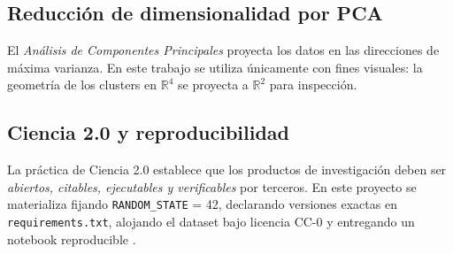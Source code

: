 \subsection{Reducción de dimensionalidad por PCA}

El \emph{Análisis de Componentes Principales} \citep{pearson1901pca,jolliffe2002principal} proyecta los datos en las direcciones de máxima varianza. En este trabajo se utiliza únicamente con fines visuales: la geometría de los clusters en $\mathbb{R}^4$ se proyecta a $\mathbb{R}^2$ para inspección.

\subsection{Ciencia 2.0 y reproducibilidad}

La práctica de Ciencia 2.0 \citep{shneiderman2008science20,wilkinson2016fair} establece que los productos de investigación deben ser \emph{abiertos, citables, ejecutables y verificables} por terceros. En este proyecto se materializa fijando \texttt{RANDOM\_STATE} = 42, declarando versiones exactas en \texttt{requirements.txt}, alojando el dataset bajo licencia CC-0 y entregando un notebook reproducible \citep{kluyver2016jupyter}.
